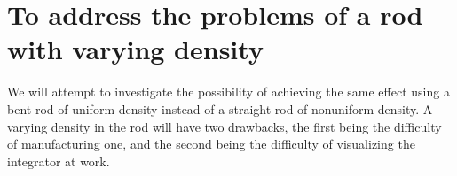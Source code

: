 \documentclass[letterpaper, 12pt]{article}
\begin{document}
\section{To address the problems of a rod with varying density}
We will attempt to investigate the possibility of achieving the same effect using a bent rod of uniform density instead of a straight rod of nonuniform density.
A varying density in the rod will have two drawbacks, the first being the difficulty of manufacturing one, and the second being the difficulty of visualizing the integrator at work.
\begin{center}
\end{center}
\end{document}
